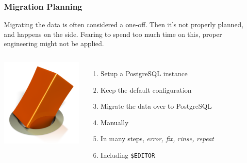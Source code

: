 \documentclass[xcolor=dvipsnames]{beamer}
\begin{document}
\begin{frame}[fragile]
  \frametitle{Migration Planning}

  Migrating the data is often considered a one-off. Then it's not properly
  planned, and happens on the side. Fearing to spend too much time on this,
  proper engineering might not be applied.

  \vfill
  
  \begin{columns}[c]
    \begin{center}
      \includegraphics[height=12em]{round_hole_square_peg_6617.png}
    \end{center}

    \begin{enumerate}
    \item Setup a PostgreSQL instance
    \item Keep the default configuration
    \item Migrate the data over to PostgreSQL
    \item Manually
    \item In many steps, \textit{error, fix, rinse, repeat}
    \item Including \texttt{\$EDITOR}
    \end{enumerate}
  \end{columns}
\end{frame}
\end{document}
